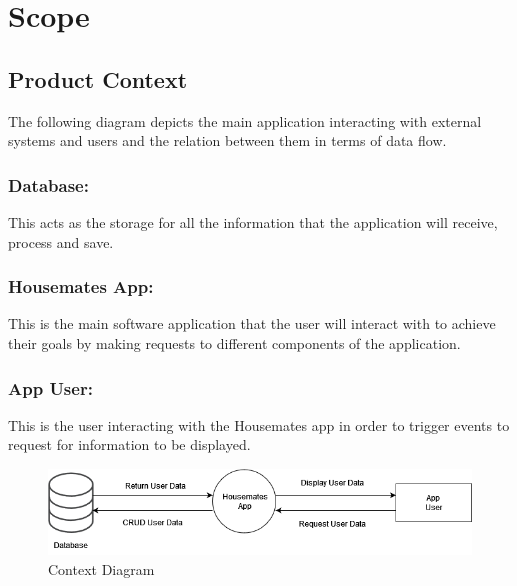\documentclass[12pt]{article}
\newcommand{\lips}{\textit{Insert your content here.}}
\begin{document}

\section{Scope}
\subsection{Product Context}
The following diagram depicts the main application interacting with external systems and users and the relation between them in terms of data flow.

\subsubsection*{Database:}This acts as the storage for all the information that the application will receive, process and save.

\subsubsection*{Housemates App:} This is the main software application that the user will interact with to achieve their goals by making requests to different components of the application.

\subsubsection*{App User:} This is the user interacting with the Housemates app in order to trigger events to request for information to be displayed.
\begin{figure}[H]
    \centering
	\includegraphics[width=15cm]{ContextDiagram.png}
	\caption{Context Diagram}
 \label{}
\end{figure}
\end{document}
